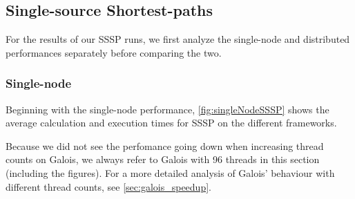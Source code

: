

\subsection{Single-source Shortest-paths}
For the results of our SSSP runs, we first analyze the single-node and distributed performances separately before comparing the two.

\subsubsection{Single-node}
Beginning with the single-node performance, \autoref{fig:singleNodeSSSP} shows the average calculation and execution times for SSSP on the different frameworks.

Because we did not see the perfomance going down when increasing thread counts on Galois, we always refer to Galois with 96 threads in this section (including the figures). 
For a more detailed analysis of Galois' behaviour with different thread counts, see \autoref{sec:galois_speedup}. 




